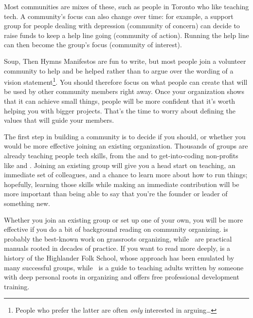 Most communities are mixes of these,
such as people in Toronto who like teaching tech.
A community's focus can also change over time:
for example,
a support group for people dealing with depression (community of concern)
can decide to raise funds to keep a help line going (community of action).
Running the help line can then become the group's focus (community of interest).

\begin{aside}{Soup, Then Hymns}
  Manifestos are fun to write,
  but most people join a volunteer community to help and be helped
  rather than to argue over the wording of a vision statement\footnote{
    People who prefer the latter are often \emph{only} interested in arguing{\ldots}}.
  You should therefore focus on
  what people can create that will be used by other community members right away.
  Once your organization shows that it can achieve small things,
  people will be more confident that it's worth helping you with bigger projects.
  That's the time to worry about defining the values that will guide your members.
\end{aside}


The first step in building a community is to decide if you should,
or whether you would be more effective joining an existing organization.
Thousands of groups are already teaching people tech skills,
from the 
and 
to get-into-coding non-profits like
and .
Joining an existing group will give you a head start on teaching,
an immediate set of colleagues,
and a chance to learn more about how to run things;
hopefully,
learning those skills while making an immediate contribution
will be more important than being able to say that
you're the founder or leader of something new.

Whether you join an existing group or set up one of your own,
you will be more effective if you do a bit of background reading on community organizing.
\cite{Alin1989,Lake2018} is probably the best-known work on grassroots organizing,
while~\cite{Brow2007,Midw2010,Lake2018} are practical manuals rooted in decades of practice.
If you want to read more deeply,
\cite{Adam1975} is a history of the Highlander Folk School,
whose approach has been emulated by many successful groups,
while~\cite{Spal2014} is a guide to teaching adults
written by someone with deep personal roots in organizing
and 
offers free professional development training.

